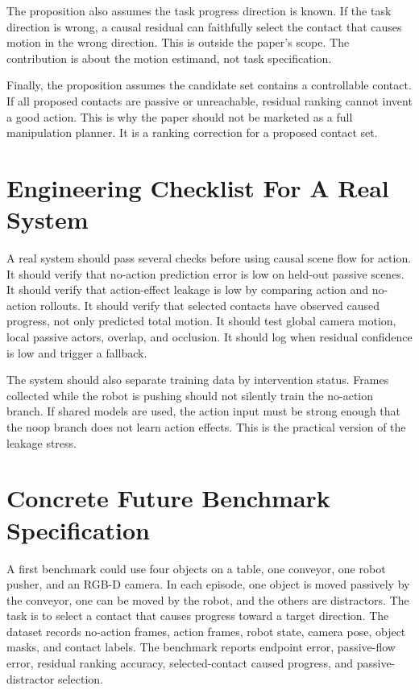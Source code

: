 \documentclass{article}
\begin{document}
The proposition also assumes the task progress direction is known.  If the task direction
is wrong, a causal residual can faithfully select the contact that causes motion in the
wrong direction.  This is outside the paper's scope.  The contribution is about the
motion estimand, not task specification.

Finally, the proposition assumes the candidate set contains a controllable contact.  If
all proposed contacts are passive or unreachable, residual ranking cannot invent a good
action.  This is why the paper should not be marketed as a full manipulation planner.
It is a ranking correction for a proposed contact set.

\section{Engineering Checklist For A Real System}

A real system should pass several checks before using causal scene flow for action.  It
should verify that no-action prediction error is low on held-out passive scenes.  It
should verify that action-effect leakage is low by comparing action and no-action
rollouts.  It should verify that selected contacts have observed caused progress, not
only predicted total motion.  It should test global camera motion, local passive actors,
overlap, and occlusion.  It should log when residual confidence is low and trigger a
fallback.

The system should also separate training data by intervention status.  Frames collected
while the robot is pushing should not silently train the no-action branch.  If shared
models are used, the action input must be strong enough that the noop branch does not
learn action effects.  This is the practical version of the leakage stress.

\section{Concrete Future Benchmark Specification}

A first benchmark could use four objects on a table, one conveyor, one robot pusher, and
an RGB-D camera.  In each episode, one object is moved passively by the conveyor, one can
be moved by the robot, and the others are distractors.  The task is to select a contact
that causes progress toward a target direction.  The dataset records no-action frames,
action frames, robot state, camera pose, object masks, and contact labels.  The benchmark
reports endpoint error, passive-flow error, residual ranking accuracy, selected-contact
caused progress, and passive-distractor selection.
\end{document}
